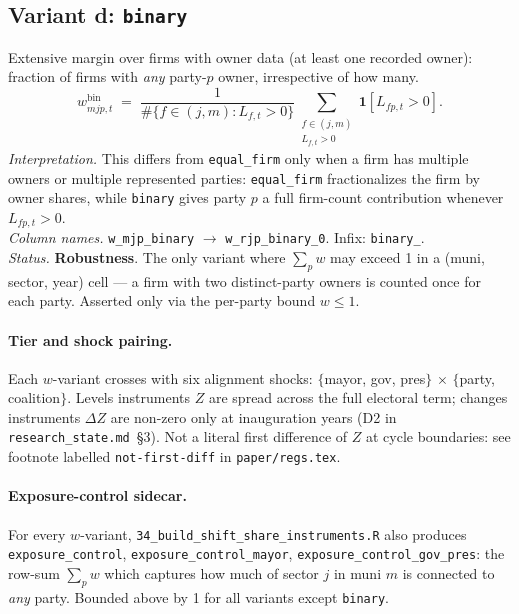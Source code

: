 \documentclass[12pt]{article}
\theoremstyle{definition}
\newcommand{\ind}{\mathbf{1}}
\begin{document}
\subsection{Variant d: \texttt{binary}}
Extensive margin over firms with owner data (at least one recorded owner): fraction of firms with \emph{any} party-$p$ owner, irrespective of how many.
\begin{equation}
w^{\text{bin}}_{m j p, t} \;=\;
\frac{1}{\#\{f \in (j,m) : L_{f,t} > 0\}}
\sum_{\substack{f \in (j,m)\\ L_{f,t}>0}}
\ind\!\left[L_{fp,t} > 0\right].
\end{equation}
\textit{Interpretation.} This differs from \texttt{equal\_firm} only when a firm has multiple owners or multiple represented parties: \texttt{equal\_firm} fractionalizes the firm by owner shares, while \texttt{binary} gives party $p$ a full firm-count contribution whenever $L_{fp,t}>0$.\\
\textit{Column names.} \texttt{w\_mjp\_binary} $\to$ \texttt{w\_rjp\_binary\_0}. Infix: \texttt{binary\_}.\\
\textit{Status.} \textbf{Robustness}. The only variant where $\sum_p w$ may exceed 1 in a (muni, sector, year) cell --- a firm with two distinct-party owners is counted once for each party. Asserted only via the per-party bound $w \le 1$.

\paragraph{Tier and shock pairing.} Each $w$-variant crosses with six alignment shocks: $\{$mayor, gov, pres$\}$ $\times$ $\{$party, coalition$\}$. Levels instruments $Z$ are spread across the full electoral term; changes instruments $\Delta Z$ are non-zero only at inauguration years (D2 in \texttt{research\_state.md}~\S3). Not a literal first difference of $Z$ at cycle boundaries: see footnote labelled \texttt{not-first-diff} in \texttt{paper/regs.tex}.

\paragraph{Exposure-control sidecar.} For every $w$-variant, \texttt{34\_build\_shift\_share\_instruments.R} also produces \texttt{exposure\_control}, \texttt{exposure\_control\_mayor}, \texttt{exposure\_control\_gov\_pres}: the row-sum $\sum_p w$ which captures how much of sector $j$ in muni $m$ is connected to \emph{any} party. Bounded above by 1 for all variants except \texttt{binary}.
\end{document}
